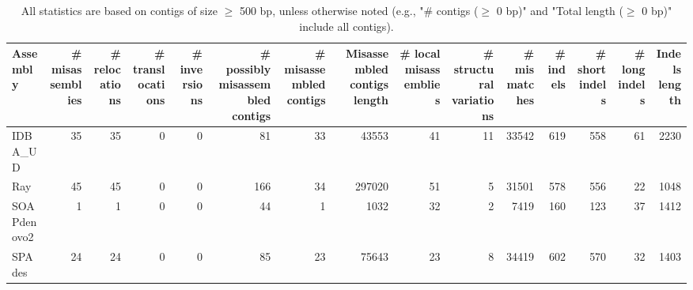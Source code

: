 \documentclass[12pt,a4paper]{article}
\begin{document}
\begin{table}[ht]
\begin{center}
\caption{All statistics are based on contigs of size $\geq$ 500 bp, unless otherwise noted (e.g., "\# contigs ($\geq$ 0 bp)" and "Total length ($\geq$ 0 bp)" include all contigs).}
\begin{tabular}{|l*{14}{|r}|}
\hline
Assembly & \# misassemblies &     \# relocations &     \# translocations &     \# inversions & \# possibly misassembled contigs & \# misassembled contigs & Misassembled contigs length & \# local misassemblies & \# structural variations & \# mismatches & \# indels &     \# short indels &     \# long indels & Indels length \\ \hline
IDBA\_UD & 35 & 35 & 0 & 0 & 81 & 33 & 43553 & 41 & 11 & 33542 & 619 & 558 & 61 & 2230 \\ \hline
Ray & 45 & 45 & 0 & 0 & 166 & 34 & 297020 & 51 & 5 & 31501 & 578 & 556 & 22 & 1048 \\ \hline
SOAPdenovo2 & 1 & 1 & 0 & 0 & 44 & 1 & 1032 & 32 & 2 & 7419 & 160 & 123 & 37 & 1412 \\ \hline
SPAdes & 24 & 24 & 0 & 0 & 85 & 23 & 75643 & 23 & 8 & 34419 & 602 & 570 & 32 & 1403 \\ \hline
\end{tabular}
\end{center}
\end{table}
\end{document}
